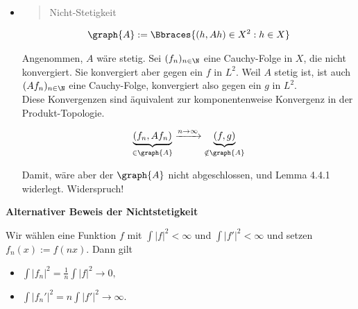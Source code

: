 \begin{solution}
\begin{enumerate}
\begin{itemize}
    \item
    \blockquote{Nicht-Stetigkeit}:

    \begin{align*}
      \graph{A} :=
      \Bbraces
      {
        (h, A h) \in X^2:
        h \in X
      }
    \end{align*}

    Angenommen, $A$ wäre stetig.
    Sei $(f_n)_{n \in \N}$ eine Cauchy-Folge in $X$, die nicht konvergiert.
    Sie konvergiert aber gegen ein $f$ in $L^2$.
    Weil $A$ stetig ist, ist auch $(A f_n)_{n \in \N}$ eine Cauchy-Folge, konvergiert also gegen ein $g$ in $L^2$. \\

    Diese Konvergenzen sind äquivalent zur komponentenweise Konvergenz in der Produkt-Topologie.

    \begin{align*}
      \underbrace{(f_n, A f_n)}_{\in \graph{A}}
      \xrightarrow{n \to \infty}
      \underbrace{(f, g)}_{\notin \graph{A}}
    \end{align*}


    Damit, wäre aber der $\graph{A}$ nicht abgeschlossen, und Lemma 4.4.1 widerlegt.
    Widerspruch!

  \end{itemize}

\end{enumerate}

\end{solution}

\begin{solution}

\textbf{Alternativer Beweis der Nichtstetigkeit}

Wir wählen eine Funktion $f$ mit $\int |f|^2 < \infty$ und $\int |f'|^2 < \infty$ und setzen $f_n(x) := f(nx).$ Dann gilt
\begin{itemize}
  \item $\int |f_n|^2 = \frac{1}{n} \int |f|^2 \longrightarrow 0,$
  \item $\int|f_n'|^2 = n \int |f'|^2 \longrightarrow \infty.$
\end{itemize}

\end{solution}

